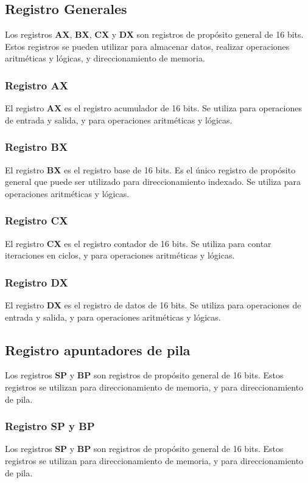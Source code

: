 \documentclass{article}
\begin{document}
\subsection*{Registro Generales}
Los registros \textbf{AX}, \textbf{BX}, \textbf{CX} y \textbf{DX} son registros de prop\'{o}sito
general de 16 bits. Estos registros se pueden utilizar para almacenar datos, realizar operaciones
aritm\'{e}ticas y l\'{o}gicas, y direccionamiento de memoria.

\subsubsection*{Registro AX}
El registro \textbf{AX} es el registro acumulador de 16 bits. Se utiliza para operaciones de entrada
y salida, y para operaciones aritm\'{e}ticas y l\'{o}gicas.

\subsubsection*{Registro BX}
El registro \textbf{BX} es el registro base de 16 bits. Es el \'{u}nico registro de prop\'{o}sito
general que puede ser utilizado para direccionamiento indexado. Se utiliza para operaciones
aritm\'{e}ticas y l\'{o}gicas.

\subsubsection*{Registro CX}
El registro \textbf{CX} es el registro contador de 16 bits. Se utiliza para contar iteraciones
en ciclos, y para operaciones aritm\'{e}ticas y l\'{o}gicas.

\subsubsection*{Registro DX}
El registro \textbf{DX} es el registro de datos de 16 bits. Se utiliza para operaciones de entrada
y salida, y para operaciones aritm\'{e}ticas y l\'{o}gicas.

\subsection*{Registro apuntadores de pila}
Los registros \textbf{SP} y \textbf{BP} son registros de prop\'{o}sito general de 16 bits. Estos
registros se utilizan para direccionamiento de memoria, y para direccionamiento de pila.

\subsubsection*{Registro SP y BP}
Los registros \textbf{SP} y \textbf{BP} son registros de prop\'{o}sito general de 16 bits. Estos
registros se utilizan para direccionamiento de memoria, y para direccionamiento de pila.
\end{document}
